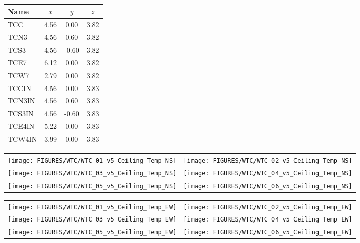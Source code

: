 \begin{figure}[h!]
\begin{center}
\begin{tabular}{|l|c|c|c|}
\hline
Name              & $x$   & $y$  & $z$ \\ \hline \hline
TCC               & 4.56  & 0.00 & 3.82 \\ \hline
TCN3              & 4.56  & 0.60 & 3.82 \\ \hline
TCS3              & 4.56  & -0.60 & 3.82 \\ \hline
TCE7              & 6.12  & 0.00 & 3.82 \\ \hline
TCW7              & 2.79  & 0.00 & 3.82 \\ \hline \hline
TCCIN               & 4.56  & 0.00 & 3.83 \\ \hline
TCN3IN              & 4.56  & 0.60 & 3.83 \\ \hline
TCS3IN              & 4.56  & -0.60 & 3.83 \\ \hline
TCE4IN              & 5.22  & 0.00 & 3.83 \\ \hline
TCW4IN              & 3.99  & 0.00 & 3.83 \\ \hline
\end{tabular}
\end{center}
\end{figure}

\begin{figure}[h!]
\begin{tabular*}{\textwidth}{l@{\extracolsep{\fill}}r}
\texttt{[image: FIGURES/WTC/WTC\_01\_v5\_Ceiling\_Temp\_NS]} &
\texttt{[image: FIGURES/WTC/WTC\_02\_v5\_Ceiling\_Temp\_NS]} \\
\texttt{[image: FIGURES/WTC/WTC\_03\_v5\_Ceiling\_Temp\_NS]} &
\texttt{[image: FIGURES/WTC/WTC\_04\_v5\_Ceiling\_Temp\_NS]} \\
\texttt{[image: FIGURES/WTC/WTC\_05\_v5\_Ceiling\_Temp\_NS]} &
\texttt{[image: FIGURES/WTC/WTC\_06\_v5\_Ceiling\_Temp\_NS]}
\end{tabular*}
\label{NIST_WTC_Ceiling_NS}
\end{figure}

\clearpage

\begin{figure}[h!]
\begin{tabular*}{\textwidth}{l@{\extracolsep{\fill}}r}
\texttt{[image: FIGURES/WTC/WTC\_01\_v5\_Ceiling\_Temp\_EW]} &
\texttt{[image: FIGURES/WTC/WTC\_02\_v5\_Ceiling\_Temp\_EW]} \\
\texttt{[image: FIGURES/WTC/WTC\_03\_v5\_Ceiling\_Temp\_EW]} &
\texttt{[image: FIGURES/WTC/WTC\_04\_v5\_Ceiling\_Temp\_EW]} \\
\texttt{[image: FIGURES/WTC/WTC\_05\_v5\_Ceiling\_Temp\_EW]} &
\texttt{[image: FIGURES/WTC/WTC\_06\_v5\_Ceiling\_Temp\_EW]}
\end{tabular*}
\label{NIST_WTC_Ceiling_EW}
\end{figure}


